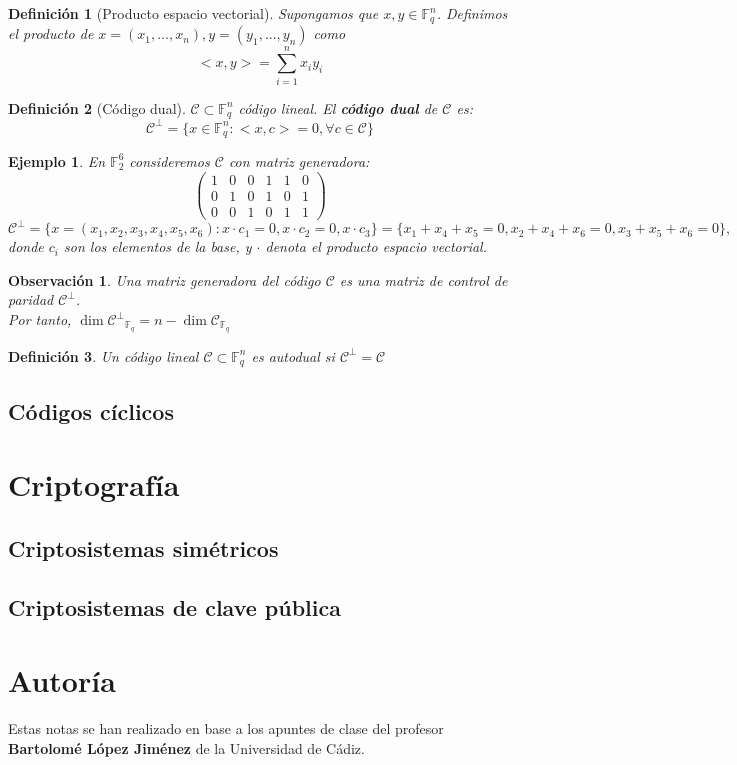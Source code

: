 \documentclass[spanish]{book}
\newtheorem{mydef}{Definición}
\newtheorem{ejem}{Ejemplo}
\newtheorem{obsv}{Observación}
\begin{document}
\begin{mydef}[Producto espacio vectorial]
	Supongamos que $x, y \in \mathbb{F}_q^n$. Definimos el producto de $x=(x_1, ..., x_n), y=(y_1, ..., y_n)$ como 
	$$ <x, y> = \sum_{i=1}^{n} x_i y_i $$
\end{mydef}

\begin{mydef}[Código dual]
	$\mathcal{C} \subset \mathbb{F}_q^n$ código lineal. El \textbf{código dual} de $\mathcal{C}$ es:
	$$ \mathcal{C}^\bot=\{x \in \mathbb{F}_q^n : <x, c> = 0, \forall c \in \mathcal{C} \}$$
\end{mydef}

\begin{ejem}
	En $\mathbb{F}_2^6$ consideremos $\mathcal{C}$ con matriz generadora:
	$$\left(
	\begin{array}{cccccc}
	1 & 0 & 0 & 1 & 1 & 0 \\
	0 & 1 & 0 & 1 & 0 & 1 \\
	0 & 0 & 1 & 0 & 1 & 1
	\end{array} \right)
	$$
	$$\mathcal{C}^\bot=\{x=(x_1, x_2, x_3, x_4, x_5, x_6): x \cdot c_1=0, x \cdot c_2 = 0, x \cdot c_3 \}=\{x_1+x_4+x_5=0, x_2+x_4+x_6=0, x_3+x_5+x_6=0\},$$
	donde $c_i$ son los elementos de la base, y $\cdot$ denota el producto espacio vectorial.
\end{ejem}

\begin{obsv}
	Una matriz generadora del código $\mathcal{C}$ es una matriz de control de paridad  $\mathcal{C}^\bot$. \\
	Por tanto, $\dim{\mathcal{C}^\bot}_{\mathbb{F}_q}=n-\dim{\mathcal{C}}_{\mathbb{F}_q}$
\end{obsv}

\begin{mydef}
	Un código lineal $\mathcal{C} \subset \mathbb{F}_q^n$ es autodual si $\mathcal{C}^\bot = \mathcal{C}$
\end{mydef}
\section{Códigos cíclicos}

\chapter{Criptografía}
\section{Criptosistemas simétricos}
\section{Criptosistemas de clave pública}

\chapter*{Autoría}
Estas notas se han realizado en base a los apuntes de clase del profesor \textbf{Bartolomé López Jiménez} de la Universidad de Cádiz.
\end{document}

